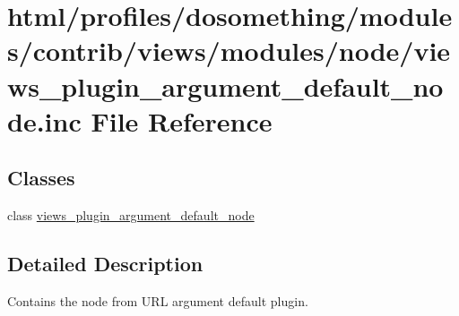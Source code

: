 \hypertarget{views__plugin__argument__default__node_8inc}{
\section{html/profiles/dosomething/modules/contrib/views/modules/node/views\_\-plugin\_\-argument\_\-default\_\-node.inc File Reference}
\label{views__plugin__argument__default__node_8inc}
}
\subsection*{Classes}
\begin{DoxyCompactItemize}
\item 
class \hyperlink{classviews__plugin__argument__default__node}{views\_\-plugin\_\-argument\_\-default\_\-node}
\end{DoxyCompactItemize}


\subsection{Detailed Description}
Contains the node from URL argument default plugin. 